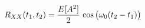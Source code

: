 \documentclass[preview]{standalone}
\begin{document}
\begin{align*}
\special{dvisvgm:raw <g id='unique000'>}R_{XX}(t_1,t_2)=\frac{E[A^2]}{2}\,\cos\big(\omega_0(t_2-t_1)\big)\special{dvisvgm:raw </g>}
\end{align*}
\end{document}
